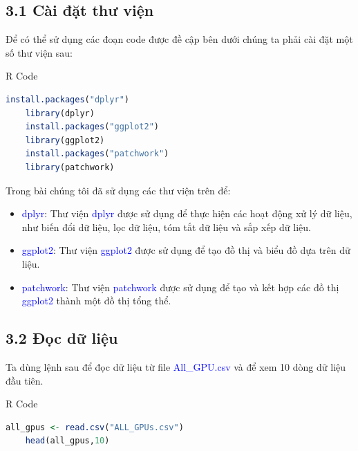 \documentclass[a4paper]{article}
\newcommand{\gachdau}{\hspace*{1.5em}\ignorespaces}
\begin{document}
        \subsection*{3.1 Cài đặt thư viện}
            \gachdau
            Để có thể sử dụng các đoạn code được đề cập bên dưới chúng ta phải cài đặt một số thư viện sau:
\begin{mybox}{R Code}
    \begin{lstlisting}[language={R}]
    install.packages("dplyr")
    library(dplyr)
    install.packages("ggplot2")
    library(ggplot2)
    install.packages("patchwork")
    library(patchwork)
    \end{lstlisting}
\end{mybox}
            \hspace{1pt}
            Trong bài chúng tôi đã sử dụng các thư viện trên để:
            \begin{itemize}[leftmargin=3em, itemsep=-0.15em]
                \vspace{-6pt}
                \item \fontsize{13pt}{15pt}\selectfont \textcolor{blue}{dplyr}: Thư viện \textcolor{blue}{dplyr} được sử dụng để thực hiện các hoạt động xử lý dữ liệu, như biến đổi dữ liệu, lọc dữ liệu, tóm tắt dữ liệu và sắp xếp dữ liệu.
                \item \fontsize{13pt}{15pt}\selectfont \textcolor{blue}{ggplot2}: Thư viện \textcolor{blue}{ggplot2} được sử dụng để tạo đồ thị và biểu đồ dựa trên dữ liệu.
                \item \fontsize{13pt}{15pt}\selectfont \textcolor{blue}{patchwork}: Thư viện \textcolor{blue}{patchwork} được sử dụng để tạo và kết hợp các đồ thị \textcolor{blue}{ggplot2} thành một đồ thị tổng thể.
            \end{itemize}
                
        \subsection*{3.2 Đọc dữ liệu}
            \gachdau
            Ta dùng lệnh sau để đọc dữ liệu từ file \textcolor{blue}{All\_GPU.csv} và để xem 10 dòng dữ liệu đầu tiên.
\begin{mybox}{R Code}
    \begin{lstlisting}[language={R}]
    all_gpus <- read.csv("ALL_GPUs.csv")
    head(all_gpus,10)
    \end{lstlisting}
\end{mybox}
\end{document}
